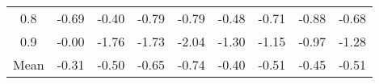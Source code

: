 \begin{longtable}{ | c || c | c | c | c | c | c | c || c |}
0.8 &  \cellcolor[HTML]{FFEFEF} -0.69 &  \cellcolor[HTML]{FFF7F7} -0.40 &  \cellcolor[HTML]{FFEFEF} -0.79 &  \cellcolor[HTML]{FFE7E7} -0.79 &  \cellcolor[HTML]{FFEFEF} -0.48 &  \cellcolor[HTML]{FFEFEF} -0.71 &  \cellcolor[HTML]{FFE7E7} -0.88 &  \cellcolor[HTML]{FFEFEF} -0.68 \\
0.9 &  \cellcolor[HTML]{FFFFFF} -0.00 &  \cellcolor[HTML]{FFCFCF} -1.76 &  \cellcolor[HTML]{FFD7D7} -1.73 &  \cellcolor[HTML]{FFCFCF} -2.04 &  \cellcolor[HTML]{FFDFDF} -1.30 &  \cellcolor[HTML]{FFDFDF} -1.15 &  \cellcolor[HTML]{FFE7E7} -0.97 &  \cellcolor[HTML]{FFDFDF} -1.28 \\
\hline
\hline
Mean  &  \cellcolor[HTML]{FFF7F7} -0.31 &  \cellcolor[HTML]{FFEFEF} -0.50 &  \cellcolor[HTML]{FFEFEF} -0.65 &  \cellcolor[HTML]{FFEFEF} -0.74 &  \cellcolor[HTML]{FFF7F7} -0.40 &  \cellcolor[HTML]{FFEFEF} -0.51 &  \cellcolor[HTML]{FFF7F7} -0.45 &  \cellcolor[HTML]{FFEFEF} -0.51 \\
\hline
\end{longtable}
